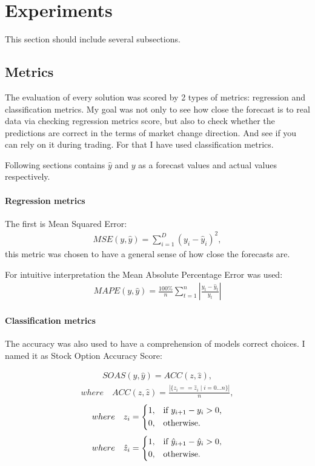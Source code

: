 \documentclass{article}
\begin{document}
\section{Experiments}
This section should include several subsections.
\subsection{Metrics}
The evaluation of every solution was scored by 2 types of metrics: regression and classification metrics.
My goal was not only to see how close the forecast is to real data via checking regression metrics score, but also to check whether the predictions are correct in the terms of market change direction. And see if you can rely on it during trading.
For that I have used classification metrics.

Following sections contains $\hat{y}$ and $y$ as a forecast values and actual values respectively.

\paragraph{Regression metrics}  

The first is Mean Squared Error:
\begin{align}
MSE(y, \hat{y})=\sum_{i=1}^{D}(y_i-\hat{y}_i)^2,
\end{align}
this metric was chosen to have a general sense of how close the forecasts are.

For intuitive interpretation the Mean Absolute Percentage Error was used:
\begin{align}
{MAPE(y, \hat{y})={\frac {100\%}{n}}\sum _{t=1}^{n}\left|{\frac {y_{t}-\hat{y}_{t}}{y_{t}}}\right|}
\end{align}
\paragraph{Classification metrics}

The accuracy was also used to have a comprehension of models correct choices. I named it as Stock Option Accuracy Score:

\begin{align}
SOAS(y, \hat{y}) = ACC(z, \hat{z}),
\end{align}
\begin{align}
where \quad ACC(z, \hat{z}) = \frac{\left|\{z_i == \hat{z}_i \mid i = 0...n\}\right|}{n}, \nonumber 
\end{align}
 \begin{align}
    where \quad z_{i} = \begin{dcases*}
        1, & if $ y_{i+1} - y_{i} > 0 $,\\
        0, & otherwise. 
        \end{dcases*} \nonumber 
  \end{align}
 \begin{align}
    where \quad \hat{z}_{i} = \begin{dcases*}
        1, & if $ \hat{y}_{i+1} - \hat{y}_{i} > 0 $,\\
        0, & otherwise. 
        \end{dcases*} \nonumber 
  \end{align}
\end{document}
